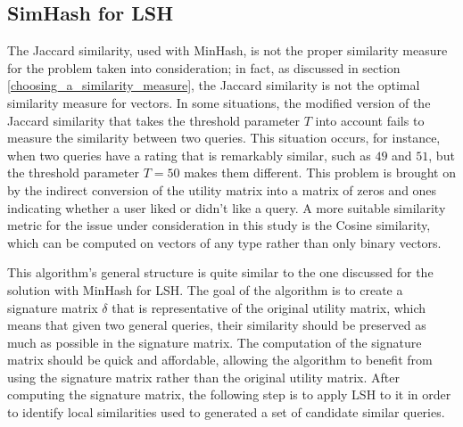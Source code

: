 \subsection{SimHash for LSH}
\label{simhash_section}
The Jaccard similarity, used with MinHash, is not the proper similarity measure for the problem taken into consideration; in fact, as discussed in section \ref{choosing_a_similarity_measure}, the Jaccard similarity is not the optimal similarity measure for vectors. In some situations, the modified version of the Jaccard similarity that takes the threshold parameter $T$ into account fails to measure the similarity between two queries. This situation occurs, for instance, when two queries have a rating that is remarkably similar, such as $49$ and $51$, but the threshold parameter $T=50$ makes them different. This problem is brought on by the indirect conversion of the utility matrix into a matrix of zeros and ones indicating whether a user liked or didn't like a query. A more suitable similarity metric for the issue under consideration in this study is the Cosine similarity, which can be computed on vectors of any type rather than only binary vectors.

This algorithm's general structure is quite similar to the one discussed for the solution with MinHash for LSH. The goal of the algorithm is to create a signature matrix $\delta$ that is representative of the original utility matrix, which means that given two general queries, their similarity should be preserved as much as possible in the signature matrix. The computation of the signature matrix should be quick and affordable, allowing the algorithm to benefit from using the signature matrix rather than the original utility matrix. After computing the signature matrix, the following step is to apply LSH to it in order to identify local similarities used to generated a set of candidate similar queries.


